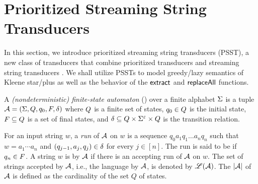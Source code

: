 
\section{Prioritized Streaming String Transducers}  \label{sect:psst}

In this section, we introduce prioritized streaming string transducers (PSST), 
a new class of transducers that combine prioritized transducers \cite{BM17} 
and streaming string transducers \cite{AC10,AD11}.
We shall utilize PSSTs to model greedy/lazy semantics of Kleene star/plus as well as the behavior of the $\mathsf{extract}$ and $\mathsf{replaceAll}$ functions.



\begin{definition} \label{def:nfa}
	A \emph{(nondeterministic) finite-state automaton}
	(\FA{}) over a finite alphabet $\Sigma$ is a tuple $\mathcal{A} =
	(\Sigma, Q, q_0, F, \delta)$ where 
	$Q$ is a finite set of 
	states, $q_0\in Q$ is
	the initial state, $F\subseteq Q$ is a set of final states, and 
	$\delta\subseteq Q \times 
	\Sigma^\varepsilon \times  Q$ is the
	transition relation. 
\end{definition}

For an input string $w$, a \emph{run} of $\mathcal{A}$ on $w$
is a sequence $q_0 a_1 q_1 \ldots a_n q_n$ such that $w = a_1 \cdots a_n$ and $(q_{j-1}, a_{j}, q_{j}) \in
\delta$ for every $j \in [n]$.
The run is said to be  if $q_n \in F$.
A string $w$ is  by $\mathcal{A}$ if there is an accepting run of
$\mathcal{A}$ on $w$. 
The set of strings accepted by $\mathcal{A}$, i.e., the language  by $\mathcal{A}$, is denoted by $\mathscr{L}(\mathcal{A})$.
The  $|\mathcal{A}|$ of $\mathcal{A}$ is defined as the cardinality of the set $Q$ of states.

